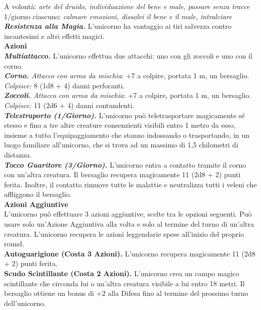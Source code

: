 \begin{multicols}{2}
A volontà: \emph{arte del druido, individuazione del bene e male,} \emph{passare senza tracce}\\
1/giorno ciascuno: \emph{calmare emozioni, dissolvi il bene e il male,} \emph{intralciare}\\
\emph{\textbf{Resistenza alla Magia.}} L'unicorno ha vantaggio ai tiri salvezza contro incantesimi e altri effetti magici.\\
\smallskip\textbf{Azioni}\\
\emph{\textbf{Multiattacco.}} L'unicorno effettua due attacchi: uno con gli zoccoli e uno con il corno.\\
\emph{\textbf{Corno.} Attacco con arma da mischia}: +7 a colpire, portata 1 m, un bersaglio.\\
\emph{Colpisce:} 8 (1d8 + 4) danni perforanti.\\
\emph{\textbf{Zoccoli.} Attacco con arma da mischia}: +7 a colpire, portata 1 m, un bersaglio.\\
\emph{Colpisce:} 11 (2d6 + 4) danni contundenti.\\
\emph{\textbf{Telestraporto (1/Giorno).}} L'unicorno può teletrasportare magicamente sé stesso e fino a tre altre creature consenzienti visibili entro 1 metro da esso, insieme a tutto l'equipaggiamento che stanno indossando o trasportando, in un luogo familiare all'unicorno, che si trova ad un massimo di 1,5 chilometri di distanza.\\
\emph{\textbf{Tocco Guaritore (3/Giorno).}} L'unicorno entra a contatto tramite il corno con un'altra creatura. Il bersaglio recupera magicamente 11 (2d8 + 2) punti ferita. Inoltre, il contatto rimuove tutte le malattie e neutralizza tutti i veleni che affliggono il bersaglio.\\
\textbf{Azioni Aggiuntive}\\
L'unicorno può effettuare 3 azioni aggiuntive, scelte tra le opzioni seguenti. Può usare solo un'Azione Aggiuntiva alla volta e solo al termine del turno di un'altra creatura. L'unicorno recupera le azioni leggendarie spese all'inizio del proprio round.\\
\textbf{Autoguarigione (Costa 3 Azioni).} L'unicorno recupera magicamente 11 (2d8 + 2) punti ferita.\\
\textbf{Scudo Scintillante (Costa 2 Azioni).} L'unicorno crea un campo magico scintillante che circonda lui o un'altra creatura visibile a lui entro 18 metri. Il bersaglio ottiene un bonus di +2 alla Difesa fino al termine del prossimo turno dell'unicorno.\\

\end{multicols}
